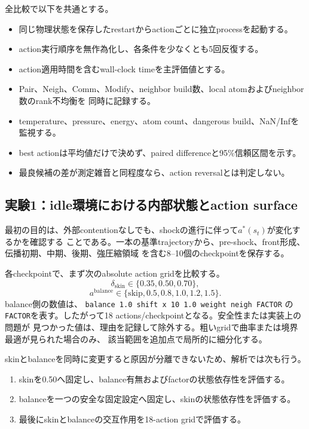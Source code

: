 全比較で以下を共通とする。
\begin{itemize}
  \item 同じ物理状態を保存したrestartからactionごとに独立processを起動する。
  \item action実行順序を無作為化し、各条件を少なくとも5回反復する。
  \item action適用時間を含むwall-clock timeを主評価値とする。
  \item Pair、Neigh、Comm、Modify、neighbor build数、local atomおよびneighbor数のrank不均衡を
        同時に記録する。
  \item temperature、pressure、energy、atom count、dangerous build、NaN/Infを監視する。
  \item best actionは平均値だけで決めず、paired differenceと95\%信頼区間を示す。
  \item 最良候補の差が測定雑音と同程度なら、action reversalとは判定しない。
\end{itemize}

\subsection{実験1：idle環境における内部状態とaction surface}

最初の目的は、外部contentionなしでも、shockの進行に伴って$a^*(s_t)$が変化するかを確認する
ことである。一本の基準trajectoryから、pre-shock、front形成、伝播初期、中期、後期、強圧縮領域
を含む8--10個のcheckpointを保存する。

各checkpointで、まず次のabsolute action gridを比較する。
\begin{equation}
 \delta_{\mathrm{skin}}\in\{0.35,0.50,0.70\},
\end{equation}
\begin{equation}
 a^{\mathrm{balance}}\in
 \{\mathrm{skip},0.5,0.8,1.0,1.2,1.5\}.
\end{equation}
balance側の数値は、
\texttt{balance 1.0 shift x 10 1.0 weight neigh FACTOR}
の\texttt{FACTOR}を表す。したがって18 actions/checkpointとなる。安全性または実装上の問題が
見つかった値は、理由を記録して除外する。粗いgridで曲率または境界最適が見られた場合のみ、
該当範囲を追加点で局所的に細分化する。

skinとbalanceを同時に変更すると原因が分離できないため、解析では次も行う。
\begin{enumerate}
  \item skinを0.50へ固定し、balance有無およびfactorの状態依存性を評価する。
  \item balanceを一つの安全な固定設定へ固定し、skinの状態依存性を評価する。
  \item 最後にskinとbalanceの交互作用を18-action gridで評価する。
\end{enumerate}


